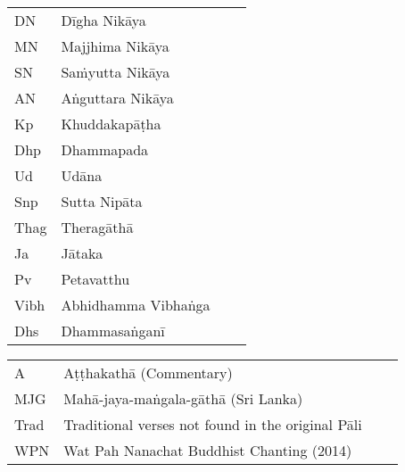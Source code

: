 \begin{tabular}{@{}llll@{}}
  DN    & Dīgha Nikāya                                        \\
  MN    & Majjhima Nikāya                                     \\
  SN    & Saṁyutta Nikāya                                     \\
  AN    & Aṅguttara Nikāya                                    \\
  Kp   & Khuddakapāṭha                                       \\
  Dhp   & Dhammapada                                          \\
  Ud    & Udāna                                               \\
  Snp   & Sutta Nipāta                                        \\
  Thag  & Theragāthā                                          \\
  Ja    & Jātaka                                              \\
  Pv    & Petavatthu                                          \\
  Vibh  & Abhidhamma Vibhaṅga                                 \\
  Dhs   & Dhammasaṅganī                                       \\
\end{tabular}

\begin{tabular}{@{}llll@{}}
  A     & Aṭṭhakathā (Commentary)                             \\
  MJG   & Mahā-jaya-maṅgala-gāthā (Sri Lanka)                 \\
  Trad  & Traditional verses not found in the original Pāli   \\
  WPN   & Wat Pah Nanachat Buddhist Chanting (2014)           \\
\end{tabular}

\medskip

\fi

